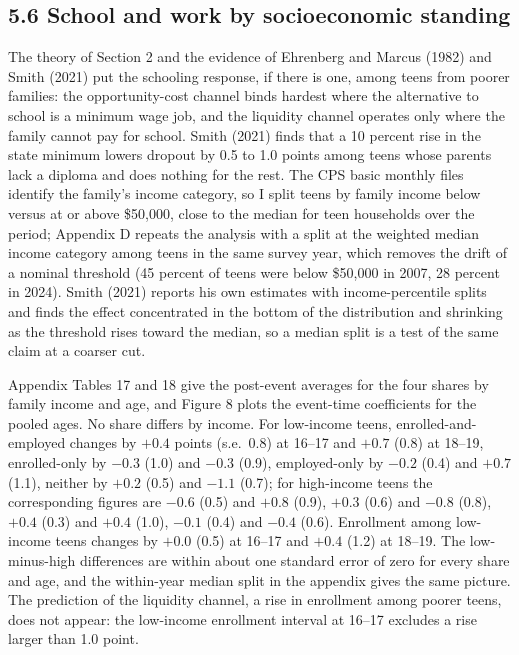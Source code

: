 \documentclass[12pt]{article}
\begin{document}
\subsection{5.6 School and work by socioeconomic standing}

The theory of Section 2 and the evidence of Ehrenberg and Marcus (1982) and Smith (2021) put the schooling response, if there is one, among teens from poorer families: the opportunity-cost channel binds hardest where the alternative to school is a minimum wage job, and the liquidity channel operates only where the family cannot pay for school. Smith (2021) finds that a 10 percent rise in the state minimum lowers dropout by 0.5 to 1.0 points among teens whose parents lack a diploma and does nothing for the rest. The CPS basic monthly files identify the family's income category, so I split teens by family income below versus at or above \$50,000, close to the median for teen households over the period; Appendix D repeats the analysis with a split at the weighted median income category among teens in the same survey year, which removes the drift of a nominal threshold (45 percent of teens were below \$50,000 in 2007, 28 percent in 2024). Smith (2021) reports his own estimates with income-percentile splits and finds the effect concentrated in the bottom of the distribution and shrinking as the threshold rises toward the median, so a median split is a test of the same claim at a coarser cut.

Appendix Tables 17 and 18 give the post-event averages for the four shares by family income and age, and Figure 8 plots the event-time coefficients for the pooled ages. No share differs by income. For low-income teens, enrolled-and-employed changes by $+0.4$ points (s.e.\ 0.8) at 16--17 and $+0.7$ (0.8) at 18--19, enrolled-only by $-0.3$ (1.0) and $-0.3$ (0.9), employed-only by $-0.2$ (0.4) and $+0.7$ (1.1), neither by $+0.2$ (0.5) and $-1.1$ (0.7); for high-income teens the corresponding figures are $-0.6$ (0.5) and $+0.8$ (0.9), $+0.3$ (0.6) and $-0.8$ (0.8), $+0.4$ (0.3) and $+0.4$ (1.0), $-0.1$ (0.4) and $-0.4$ (0.6). Enrollment among low-income teens changes by $+0.0$ (0.5) at 16--17 and $+0.4$ (1.2) at 18--19. The low-minus-high differences are within about one standard error of zero for every share and age, and the within-year median split in the appendix gives the same picture. The prediction of the liquidity channel, a rise in enrollment among poorer teens, does not appear: the low-income enrollment interval at 16--17 excludes a rise larger than 1.0 point.
\end{document}
